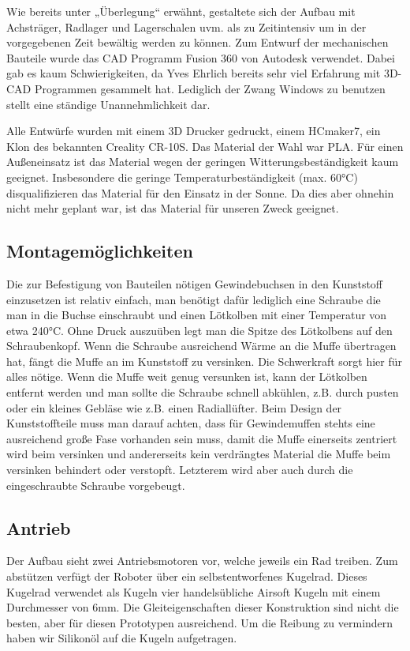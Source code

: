 \documentclass{article}
\begin{document}
Wie bereits unter „Überlegung“ erwähnt, gestaltete sich der Aufbau mit Achsträger, Radlager und Lagerschalen uvm. als zu Zeitintensiv um in der vorgegebenen Zeit bewältig werden zu können.
Zum Entwurf der mechanischen Bauteile wurde das CAD Programm Fusion 360 von Autodesk verwendet. Dabei gab es kaum Schwierigkeiten, da Yves Ehrlich bereits sehr viel Erfahrung mit 3D-CAD Programmen gesammelt hat. Lediglich der Zwang Windows zu benutzen stellt eine ständige Unannehmlichkeit dar.

Alle Entwürfe wurden mit einem 3D Drucker gedruckt, einem HCmaker7, ein Klon des bekannten Creality CR-10S.
Das Material der Wahl war PLA. Für einen Außeneinsatz ist das Material wegen der geringen Witterungsbeständigkeit kaum geeignet. Insbesondere die geringe Temperaturbeständigkeit (max. 60°C) disqualifizieren das Material für den Einsatz in der Sonne. Da dies aber ohnehin nicht mehr geplant war, ist das Material für unseren Zweck geeignet.
\subsection{Montagemöglichkeiten}
Die zur Befestigung von Bauteilen nötigen Gewindebuchsen in den Kunststoff einzusetzen ist relativ einfach, man benötigt dafür lediglich eine Schraube die man in die Buchse einschraubt und einen Lötkolben mit einer Temperatur von etwa 240°C. Ohne Druck auszuüben legt man die Spitze des Lötkolbens auf den Schraubenkopf. Wenn die Schraube ausreichend Wärme an die Muffe übertragen hat, fängt die Muffe an im Kunststoff zu versinken. Die Schwerkraft sorgt hier für alles nötige. Wenn die Muffe weit genug versunken ist, kann der Lötkolben entfernt werden und man sollte die Schraube schnell abkühlen, z.B. durch pusten oder ein kleines Gebläse wie z.B. einen Radiallüfter.
Beim Design der Kunststoffteile muss man darauf achten, dass für Gewindemuffen stehts eine ausreichend große Fase vorhanden sein muss, damit die Muffe einerseits zentriert wird beim versinken und andererseits kein verdrängtes Material die Muffe beim versinken behindert oder verstopft. Letzterem wird aber auch durch die eingeschraubte Schraube vorgebeugt.
\subsection{Antrieb}
Der Aufbau sieht zwei Antriebsmotoren vor, welche jeweils ein Rad treiben. Zum abstützen verfügt der Roboter über ein selbstentworfenes Kugelrad. Dieses Kugelrad verwendet als Kugeln vier handelsübliche Airsoft Kugeln mit einem Durchmesser von 6mm.
Die Gleiteigenschaften dieser Konstruktion sind nicht die besten, aber für diesen Prototypen ausreichend. Um die Reibung zu vermindern haben wir Silikonöl auf die Kugeln aufgetragen.
\end{document}
